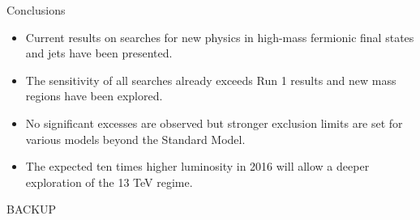 \documentclass[8pt]{beamer}
\begin{document}
\begin{frame}{\large Conclusions}
 \begin{itemize}
  \item[\Checkmark] Current results on searches for new physics in high-mass fermionic final states and 
	jets have been presented.
  \vspace{0.3cm}
  \item[\Checkmark] The sensitivity of all searches already exceeds Run 1 results and 
	new mass regions have been explored. 
  \vspace{0.3cm}
  \item[\Checkmark] No significant excesses are observed but stronger exclusion limits are set for various models
beyond the Standard Model.
  \vspace{0.3cm}
  \item The expected ten times higher luminosity in 2016 will allow a 
	deeper exploration of the 13 TeV regime.
  \vspace{0.3cm}
 \end{itemize}

\end{frame}
\backupbegin
\begin{frame}{\large BACKUP}
 
\end{frame}
\end{document}
